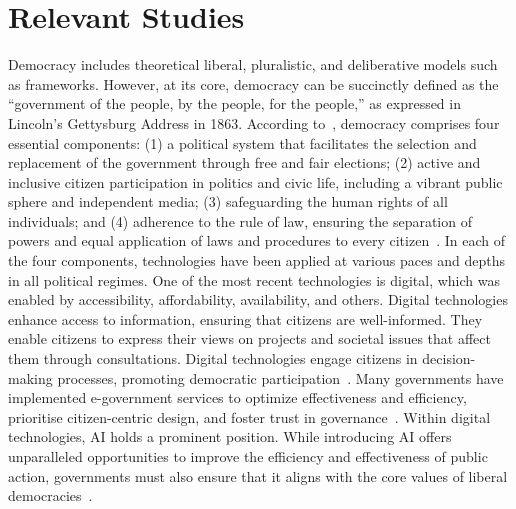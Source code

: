 \documentclass[
]{ceurart}
\begin{document}
\section{Relevant Studies}
Democracy includes theoretical liberal, pluralistic, and deliberative models such as frameworks. However, at its core, democracy can be succinctly defined as the ``government of the people, by the people, for the people,'' as expressed in Lincoln's Gettysburg Address in 1863. According 
to~\cite{larry2008spirit}, democracy comprises four essential components: (1) a political system that facilitates the selection and replacement of the government through free and fair elections; (2) active and inclusive citizen participation in politics and civic life, including a vibrant public sphere and independent media; (3) safeguarding the human rights of all individuals; and (4) adherence to the rule of law, ensuring the separation of powers and equal application of laws and procedures to every 
citizen~\cite{larry2008spirit, schneider2020democratic}. In each of the four components, technologies have been applied at various paces and depths in all political regimes. One of the most recent technologies is digital, which was enabled by accessibility, affordability, availability, and others. Digital technologies enhance access to information, ensuring that citizens are well-informed. They enable citizens to express their views on projects and societal issues that affect them through consultations. Digital technologies engage citizens in decision-making processes, promoting democratic participation~\cite{oecd2001}. Many governments have implemented e-government services to optimize effectiveness and efficiency, prioritise citizen-centric design, and foster trust in governance~\cite{pena2020oecd}.
Within digital technologies, AI holds a prominent position. While introducing AI offers unparalleled opportunities to improve the efficiency and effectiveness of public action, governments must also ensure that it aligns with the core values of liberal democracies~\cite{sharma2020artificial}. 
\end{document}
